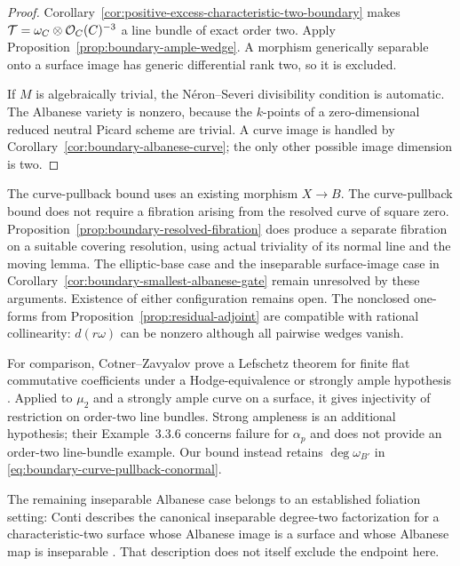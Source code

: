 \begin{proof}
Corollary~\ref{cor:positive-excess-characteristic-two-boundary}
makes $\mathcal T=\omega_C\otimes\mathcal O_C(C)^{-3}$ a line bundle of
exact order two.  Apply Proposition~\ref{prop:boundary-ample-wedge}.
A morphism generically separable onto a surface image has generic
differential rank two, so it is excluded.

If $M$ is algebraically trivial, the N\'eron--Severi divisibility
condition is automatic.  The Albanese variety is nonzero, because
the $k$-points of a zero-dimensional reduced neutral Picard scheme
are trivial.  A curve image is handled by
Corollary~\ref{cor:boundary-albanese-curve}; the only other possible
image dimension is two.
\end{proof}

\begin{remark}
\label{rem:boundary-albanese-scope}
The curve-pullback bound uses an existing morphism $X\to B$.
The curve-pullback bound does not require a fibration arising
from the resolved curve of square zero. Proposition~\ref{prop:boundary-resolved-fibration}
does produce a separate fibration on a suitable covering resolution,
using actual triviality of its normal line and the moving lemma.
The elliptic-base case and the inseparable surface-image case in
Corollary~\ref{cor:boundary-smallest-albanese-gate} remain unresolved
by these arguments.  Existence of either configuration remains open.
The nonclosed one-forms from Proposition~\ref{prop:residual-adjoint}
are compatible with rational collinearity: $d(r\omega)$ can be
nonzero although all pairwise wedges vanish.

For comparison, Cotner--Zavyalov prove a Lefschetz theorem for finite
flat commutative coefficients under a Hodge-equivalence or strongly
ample hypothesis \cite[Theorem~3.3.5, pp.~1861--1862]{CotnerZavyalov}.
Applied to $\mu_2$ and a strongly ample curve on a surface, it gives
injectivity of restriction on order-two line bundles.  Strong
ampleness is an additional hypothesis; their Example~3.3.6 concerns
failure for $\alpha_p$ and does not provide an order-two line-bundle
example.  Our bound instead retains $\deg\omega_{B'}$ in
\eqref{eq:boundary-curve-pullback-conormal}.

The remaining inseparable Albanese case belongs to an established
foliation setting: Conti describes the canonical inseparable
degree-two factorization for a characteristic-two surface whose
Albanese image is a surface and whose Albanese map is inseparable
\cite[Lemma~2.22 and Remark~2.23, p.~13]{ContiPositiveSeveriComparison}.
That description does not itself exclude the endpoint here.
\end{remark}
